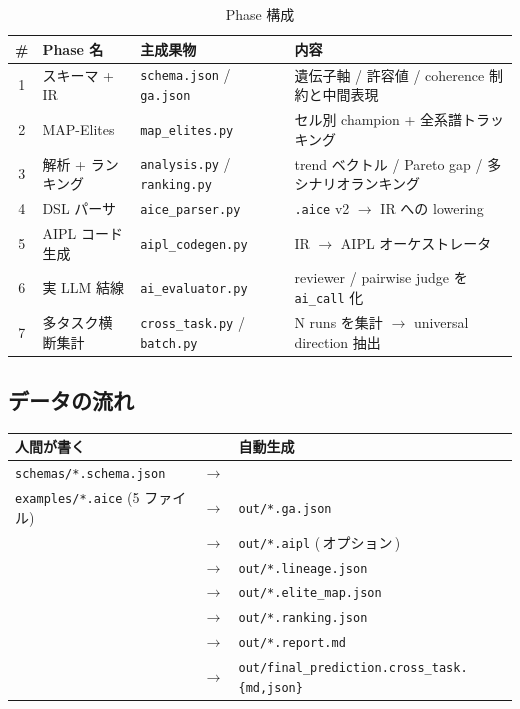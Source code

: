 \documentclass[a4paper,11pt]{article}
\begin{document}
\begin{table}[h]
\centering
\caption{Phase 構成}
\label{tab:phases}
\small
\begin{tabularx}{\linewidth}{cllX}
\toprule
\# & Phase 名 & 主成果物 & 内容 \\
\midrule
1 & スキーマ + IR        & \texttt{schema.json} / \texttt{ga.json}    & 遺伝子軸 / 許容値 / coherence 制約と中間表現 \\
2 & MAP-Elites           & \texttt{map\_elites.py}                    & セル別 champion + 全系譜トラッキング \\
3 & 解析 + ランキング    & \texttt{analysis.py} / \texttt{ranking.py} & trend ベクトル / Pareto gap / 多シナリオランキング \\
4 & DSL パーサ           & \texttt{aice\_parser.py}                   & \texttt{.aice} v2 \(\to\) IR への lowering \\
5 & AIPL コード生成      & \texttt{aipl\_codegen.py}                  & IR \(\to\) AIPL オーケストレータ \\
6 & 実 LLM 結線          & \texttt{ai\_evaluator.py}                  & reviewer / pairwise judge を \texttt{ai\_call} 化 \\
7 & 多タスク横断集計     & \texttt{cross\_task.py} / \texttt{batch.py} & N runs を集計 \(\to\) universal direction 抽出 \\
\bottomrule
\end{tabularx}
\end{table}

\subsection{データの流れ}

\begin{center}
\small
\begin{tabular}{lcl}
\textbf{人間が書く} &        & \textbf{自動生成} \\
\midrule
\texttt{schemas/*.schema.json}        & $\rightarrow$ &                       \\
\texttt{examples/*.aice} (5 ファイル) & $\rightarrow$ & \texttt{out/*.ga.json} \\
                                      & $\rightarrow$ & \texttt{out/*.aipl} (\,オプション\,) \\
                                      & $\rightarrow$ & \texttt{out/*.lineage.json} \\
                                      & $\rightarrow$ & \texttt{out/*.elite\_map.json} \\
                                      & $\rightarrow$ & \texttt{out/*.ranking.json} \\
                                      & $\rightarrow$ & \texttt{out/*.report.md} \\
                                      & $\rightarrow$ & \texttt{out/final\_prediction.cross\_task.\{md,json\}}
\end{tabular}
\end{center}
\end{document}
